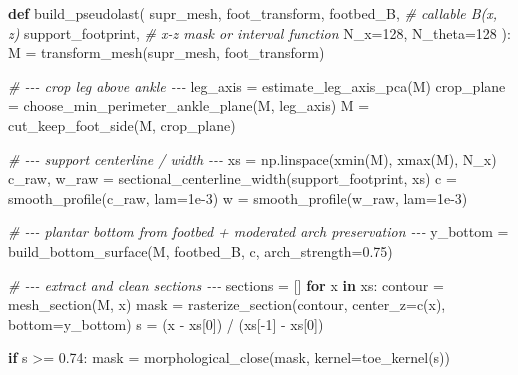 \documentclass[
  10.5pt,
]{article}
\newenvironment{Shaded}{}{}
\newcommand{\CommentTok}[1]{\textcolor[rgb]{0.38,0.63,0.69}{\textit{#1}}}
\newcommand{\ControlFlowTok}[1]{\textcolor[rgb]{0.00,0.44,0.13}{\textbf{#1}}}
\newcommand{\DecValTok}[1]{\textcolor[rgb]{0.25,0.63,0.44}{#1}}
\newcommand{\FloatTok}[1]{\textcolor[rgb]{0.25,0.63,0.44}{#1}}
\newcommand{\KeywordTok}[1]{\textcolor[rgb]{0.00,0.44,0.13}{\textbf{#1}}}
\newcommand{\NormalTok}[1]{#1}
\newcommand{\OperatorTok}[1]{\textcolor[rgb]{0.40,0.40,0.40}{#1}}
\begin{document}
\begin{Shaded}
\begin{Highlighting}[]
\KeywordTok{def}\NormalTok{ build\_pseudolast(}
\NormalTok{    supr\_mesh,}
\NormalTok{    foot\_transform,}
\NormalTok{    footbed\_B,           }\CommentTok{\# callable B(x, z)}
\NormalTok{    support\_footprint,   }\CommentTok{\# x{-}z mask or interval function}
\NormalTok{    N\_x}\OperatorTok{=}\DecValTok{128}\NormalTok{,}
\NormalTok{    N\_theta}\OperatorTok{=}\DecValTok{128}
\NormalTok{):}
\NormalTok{    M }\OperatorTok{=}\NormalTok{ transform\_mesh(supr\_mesh, foot\_transform)}

    \CommentTok{\# {-}{-}{-} crop leg above ankle {-}{-}{-}}
\NormalTok{    leg\_axis }\OperatorTok{=}\NormalTok{ estimate\_leg\_axis\_pca(M)}
\NormalTok{    crop\_plane }\OperatorTok{=}\NormalTok{ choose\_min\_perimeter\_ankle\_plane(M, leg\_axis)}
\NormalTok{    M }\OperatorTok{=}\NormalTok{ cut\_keep\_foot\_side(M, crop\_plane)}

    \CommentTok{\# {-}{-}{-} support centerline / width {-}{-}{-}}
\NormalTok{    xs }\OperatorTok{=}\NormalTok{ np.linspace(xmin(M), xmax(M), N\_x)}
\NormalTok{    c\_raw, w\_raw }\OperatorTok{=}\NormalTok{ sectional\_centerline\_width(support\_footprint, xs)}
\NormalTok{    c }\OperatorTok{=}\NormalTok{ smooth\_profile(c\_raw, lam}\OperatorTok{=}\FloatTok{1e{-}3}\NormalTok{)}
\NormalTok{    w }\OperatorTok{=}\NormalTok{ smooth\_profile(w\_raw, lam}\OperatorTok{=}\FloatTok{1e{-}3}\NormalTok{)}

    \CommentTok{\# {-}{-}{-} plantar bottom from footbed + moderated arch preservation {-}{-}{-}}
\NormalTok{    y\_bottom }\OperatorTok{=}\NormalTok{ build\_bottom\_surface(M, footbed\_B, c, arch\_strength}\OperatorTok{=}\FloatTok{0.75}\NormalTok{)}

    \CommentTok{\# {-}{-}{-} extract and clean sections {-}{-}{-}}
\NormalTok{    sections }\OperatorTok{=}\NormalTok{ []}
    \ControlFlowTok{for}\NormalTok{ x }\KeywordTok{in}\NormalTok{ xs:}
\NormalTok{        contour }\OperatorTok{=}\NormalTok{ mesh\_section(M, x)}
\NormalTok{        mask }\OperatorTok{=}\NormalTok{ rasterize\_section(contour, center\_z}\OperatorTok{=}\NormalTok{c(x), bottom}\OperatorTok{=}\NormalTok{y\_bottom)}
\NormalTok{        s }\OperatorTok{=}\NormalTok{ (x }\OperatorTok{{-}}\NormalTok{ xs[}\DecValTok{0}\NormalTok{]) }\OperatorTok{/}\NormalTok{ (xs[}\OperatorTok{{-}}\DecValTok{1}\NormalTok{] }\OperatorTok{{-}}\NormalTok{ xs[}\DecValTok{0}\NormalTok{])}

        \ControlFlowTok{if}\NormalTok{ s }\OperatorTok{\textgreater{}=} \FloatTok{0.74}\NormalTok{:}
\NormalTok{            mask }\OperatorTok{=}\NormalTok{ morphological\_close(mask, kernel}\OperatorTok{=}\NormalTok{toe\_kernel(s))}


\end{Highlighting}
\end{Shaded}
\end{document}
